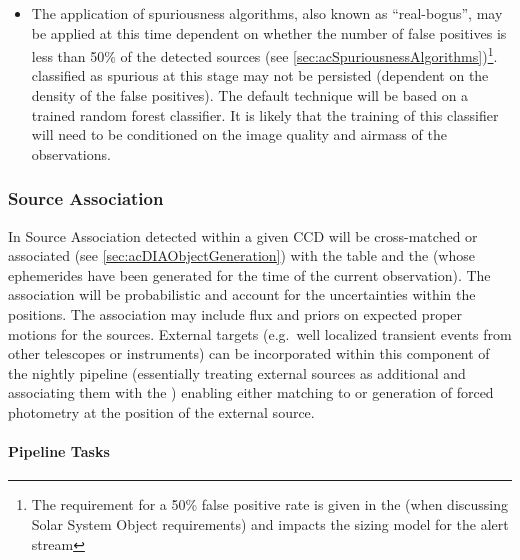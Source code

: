 \begin{itemize}
\item The application of spuriousness algorithms, also known as ``real-bogus'', may be applied at this time dependent on whether the number of false positives is less than 50\% of the detected sources   (see \ref{sec:acSpuriousnessAlgorithms})\footnote{The requirement for a 50\% false positive rate is given in the \OSS (when discussing Solar System Object requirements) and impacts the sizing model for the alert stream}. \DIASources classified as spurious at this stage may not be persisted (dependent on the density of the false positives). The default technique will be based on a trained random forest classifier. It is likely that the training of this classifier will need to be conditioned on the image quality and airmass of the observations.
\end{itemize}

\subsubsection{Source Association}
\label{sec:apSourceAssoc}

In Source Association \DIASources detected within a given CCD will be cross-matched or associated (see \ref{sec:acDIAObjectGeneration}) with the \DIAObject table and the \SSObjects (whose ephemerides have been generated for the time of the current observation). The association will be probabilistic  and account for the uncertainties within the positions. The association may include flux and priors on expected proper motions for the sources. External targets (e.g.\ well localized transient events from other telescopes or instruments) can be incorporated within this component of the nightly pipeline (essentially treating external sources as additional \DIAObjects and associating them with the \DIASources) enabling either matching to \DIASources or generation of forced photometry at the position of the external source.

\paragraph{Pipeline Tasks}

